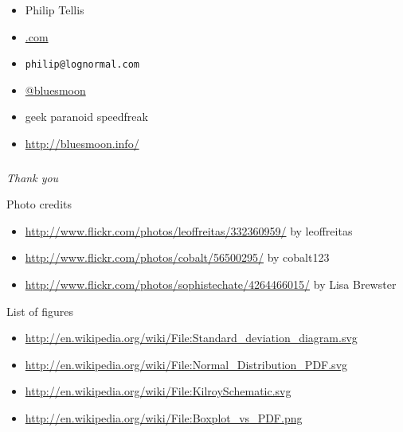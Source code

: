 \documentclass{beamer}
\newcommand{\innersplash}[1]{
  \begin{center}
    \large \textrm{\textit{ #1 } }
  \end{center}
}
\newcommand{\splashslide}[2][{}]{
  \begin{frame}
  \frametitle{#1}
  \innersplash{#2}
  \end{frame}
}
\begin{document}
\begin{frame}
  \begin{itemize}
  \item Philip Tellis
  \item \href{http://www.lognormal.com/}{\textrm{\textcolor{med-gray}{.com}}}
  \item \small{\texttt{philip@lognormal.com}}
  \item \href{http://twitter.com/bluesmoon}{@bluesmoon}
  \item geek paranoid speedfreak
  \item \href{http://bluesmoon.info/}{http://bluesmoon.info/}
  \end{itemize}
\end{frame}

\splashslide{\Huge Thank you }

\begin{frame}{Photo credits}
  \small{
  \begin{itemize}
  \item \href{http://www.flickr.com/photos/leoffreitas/332360959/}{http://www.flickr.com/photos/leoffreitas/332360959/} by leoffreitas
  \item \href{http://www.flickr.com/photos/cobalt/56500295/}{http://www.flickr.com/photos/cobalt/56500295/} by cobalt123
  \item \href{http://www.flickr.com/photos/sophistechate/4264466015/}{http://www.flickr.com/photos/sophistechate/4264466015/} by Lisa Brewster
  \end{itemize}
  }
\end{frame}

\begin{frame}{List of figures}
  \small{
  \begin{itemize}
  \item \href{http://en.wikipedia.org/wiki/File:Standard_deviation_diagram.svg}{http://en.wikipedia.org/wiki/File:Standard\_deviation\_diagram.svg}
  \item \href{http://en.wikipedia.org/wiki/File:Normal_Distribution_PDF.svg}{http://en.wikipedia.org/wiki/File:Normal\_Distribution\_PDF.svg}
  \item \href{http://en.wikipedia.org/wiki/File:KilroySchematic.svg}{http://en.wikipedia.org/wiki/File:KilroySchematic.svg}
  \item \href{http://en.wikipedia.org/wiki/File:Boxplot_vs_PDF.png}{http://en.wikipedia.org/wiki/File:Boxplot\_vs\_PDF.png}
  \end{itemize}
  }
\end{frame}
\end{document}

